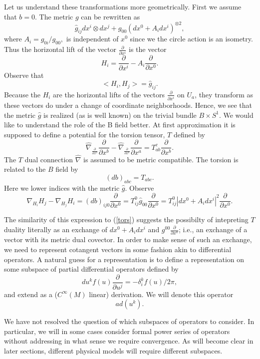 \documentclass[a4paper,11pt]{amsart}
\begin{document}
Let us understand these transformations more geometrically. First we assume
 that $b = 0$. The metric $g$ can be rewritten as
$$\hat g_{ij}dx^i\otimes dx^j + g_{00}(dx^0 + A_idx^i)^{\otimes 2},$$
where $A_i = g_{0i}/g_{00},$ is independent of $x^0$ since we the circle action
is an isometry.
Thus the horizontal lift of the vector $\frac{\partial}{\partial x^i}$ is the 
vector 
$$H_i = \frac{\partial}{\partial x^i} - A_i\frac{\partial}{\partial x^0}.$$
Observe that 
$$<H_i,H_j> = \hat g_{ij}.$$
Because the $H_i$ are the horizontal lifts of the vectors 
$\frac{\partial}{\partial x^i}$ on $U_a$, they transform as these vectors do 
under a change of coordinate neighborhoods. Hence, we see that the metric 
$\hat g$ is realized (as is well known) on the trivial bundle 
$B\times S^1$.  
We would like to understand the role of the B field better. At first
approximation it is supposed to define a potential for the torsion tensor, 
$T$ defined by 
\begin{equation}\label{tors}
\hat\nabla_{\frac{\partial}{\partial x^a}} \frac{\partial}{\partial x^b}
 - \hat\nabla_{\frac{\partial}{\partial x^b}} \frac{\partial}{\partial x^a} = 
 T_{ab}^c \frac{\partial}{\partial x^b}.
 \end{equation}
 The $T$ dual connection $\hat\nabla$ is assumed to be metric compatible. The torsion is
 related to the $B$ field by 
 $$(db)_{abc} = T_{abc}.$$
 Here we lower indices with the metric $\hat g$.
Observe 
$$\nabla_{H_i}H_j - \nabla_{H_j}H_i
 = (db)_{ij0}\frac{\partial}{\partial x^0}
  = T_{ij}^0\hat g_{00}\frac{\partial}{\partial x^0} =
  T_{ij}^0|dx^0+A_idx^i|^2\frac{\partial}{\partial x^0}.$$
  

 The similarity of this expression to (\ref{tors}) suggests the possibilty of
  intepreting  $T$ duality literally as an exchange of  
$dx^0+A_idx^i$ and $g^{00}\frac{\partial}{\partial x^0}$; i.e., an exchange of a
vector with its metric dual covector.  In order to make sense
of such an exchange, we need to represent cotangent vectors in some fashion 
akin to differential operators. A natural guess for a representation is
to define a representation on some subspace of partial differential operators
defined by  
$$du^kf(u)\frac{\partial}{\partial u^j} = -\delta^k_if(u)/2\pi,$$
and extend as a ($C^{\infty}(M)$ linear) derivation. 
We will denote this operator 
$$ad(u^k).$$

We have not resolved the question of which subspaces of operators to consider.
In particular, we will in some cases consider formal power series of operators
without addressing in what sense we require convergence. 
As will become clear in later sections, different physical models will require
different subspaces. 
\end{document}
